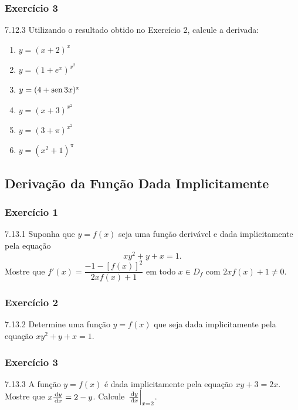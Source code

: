\subsubsection*{Exercício 3}
\begin{exercicio}[3]{7.12.3}
Utilizando o resultado obtido no Exercício 2, calcule a derivada:
\begin{enumerate}[label=\alph*)]
    \item $y = (x + 2)^x$
    \item $y = (1 + e^x)^{x^2}$
    \item $y = (4 + \operatorname{sen} 3x)^x$
    \item $y = (x + 3)^{x^2}$
    \item $y = (3 + \pi)^{x^2}$
    \item $y = (x^2 + 1)^\pi$
\end{enumerate}
\end{exercicio}

\clearpage

\subsection{Derivação da Função Dada Implicitamente}

\subsubsection*{Exercício 1}
\begin{exercicio}[1]{7.13.1}
Suponha que $y = f(x)$ seja uma função derivável e dada implicitamente pela equação
\[
xy^2 + y + x = 1.
\]
Mostre que $f'(x) = \dfrac{-1 - [f(x)]^2}{2xf(x) + 1}$ em todo $x \in D_f$ com $2xf(x) + 1 \neq 0$.
\end{exercicio}

\subsubsection*{Exercício 2}
\begin{exercicio}[2]{7.13.2}
Determine uma função $y = f(x)$ que seja dada implicitamente pela equação $xy^2 + y + x = 1$.
\end{exercicio}

\subsubsection*{Exercício 3}
\begin{exercicio}[3]{7.13.3}
A função $y = f(x)$ é dada implicitamente pela equação $xy + 3 = 2x$. Mostre que $x\frac{\,\mathrm{d} y}{\,\mathrm{d} x} = 2 - y$. Calcule $\left.\frac{\,\mathrm{d} y}{\,\mathrm{d} x}\right|_{x = 2}$.
\end{exercicio}

